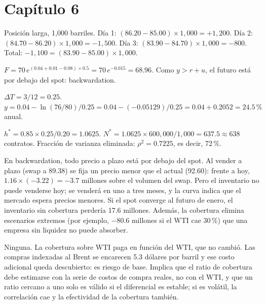 \section*{Capítulo 6}

 Posición larga, 1,000 barriles. Día 1: $(86.20-85.00)\times1{,}000=+1{,}200$. Día 2: $(84.70-86.20)\times1{,}000=-1{,}500$. Día 3: $(83.90-84.70)\times1{,}000=-800$. Total: $-1{,}100=(83.90-85.00)\times1{,}000$.

 $F=70\,e^{(0.04+0.01-0.08)\times0.5}=70\,e^{-0.015}=68.96$. Como $y>r+u$, el futuro está por debajo del spot: backwardation.

 $\Delta T=3/12=0.25$. $y=0.04-\ln(76/80)/0.25=0.04-(-0.05129)/0.25=0.04+0.2052=24.5\,\%$ anual.

 $h^*=0.85\times0.25/0.20=1.0625$. $N^*=1.0625\times600{,}000/1{,}000=637.5\approx638$ contratos. Fracción de varianza eliminada: $\rho^2=0.7225$, es decir, 72\,\%.

 En backwardation, todo precio a plazo está por debajo del spot. Al vender a plazo (swap a 89.38) se fija un precio menor que el actual (92.60): frente a hoy, $1.16\times(-3.22)=-3.7$ millones sobre el volumen del swap. Pero el inventario no puede venderse hoy; se venderá en uno a tres meses, y la curva indica que el mercado espera precios menores. Si el spot converge al futuro de enero, el inventario sin cobertura perdería 17.6 millones. Además, la cobertura elimina escenarios extremos (por ejemplo, $-80.6$ millones si el WTI cae 30\,\%) que una empresa sin liquidez no puede absorber.

 Ninguna. La cobertura sobre WTI paga en función del WTI, que no cambió. Las compras indexadas al Brent se encarecen 5.3 dólares por barril y ese costo adicional queda descubierto: es riesgo de base. Implica que el ratio de cobertura debe estimarse con la serie de costos de compra reales, no con el WTI, y que un ratio cercano a uno solo es válido si el diferencial es estable; si es volátil, la correlación cae y la efectividad de la cobertura también.
